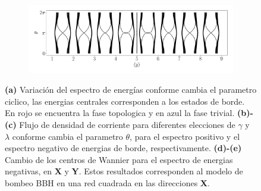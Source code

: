 \begin{figure}[h!]
     \begin{minipage}[h!]{1\textwidth}
        \begin{subfigure}[b!]{1.0 \textwidth}
            \caption{}
            \includegraphics[width=\textwidth]{Imagenes/Resultados_pump_Cuadrado/x/wannier_centery.pdf}
        \end{subfigure}\hspace*{-0.5em}
    \end{minipage}\vspace*{-0.5em}
     
     
    \caption{\textbf{(a)} Variación del espectro de energías conforme cambia el parametro ciclico, las energias centrales corresponden a los estados de borde. En rojo se encuentra la fase topologica y en azul la fase trivial. \textbf{(b)-(c)} Flujo de densidad de corriente para diferentes elecciones de $\gamma$ y $\lambda$ conforme cambia el parametro $\theta$, para el espectro positivo y el espectro negativo de energias de borde, respectivamente. \textbf{(d)-(e)} Cambio de los centros de Wannier para el espectro de energias negativas, en \textbf{X} y \textbf{Y}. Estos resultados corresponden al modelo de bombeo BBH en una red cuadrada en las direcciones \textbf{X}.}
    \label{fig:Pump_cuadrado_x}
\end{figure}